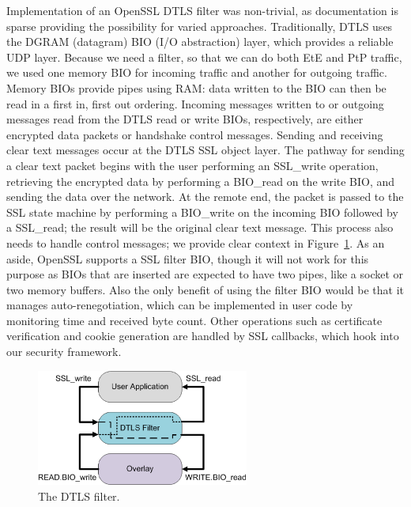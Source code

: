 \documentclass[conference]{IEEEtran}
\begin{document}
Implementation of an OpenSSL DTLS filter was non-trivial, as documentation is
sparse providing the possibility for varied approaches.  Traditionally, DTLS
uses the DGRAM (datagram) BIO (I/O abstraction) layer, which provides a reliable
UDP layer.  Because we need a filter, so that we can do both EtE and PtP traffic,
we used one memory BIO  for incoming traffic and another for outgoing traffic.
Memory BIOs provide pipes using RAM: data written to the BIO can then be read
in a first in, first out ordering.  Incoming messages written to or outgoing
messages read from the DTLS read or write BIOs, respectively, are 
either encrypted data packets or handshake control messages.  Sending and 
receiving clear text messages occur at the DTLS SSL object layer.  The pathway
for sending a clear text packet begins with the user performing an SSL\_write
operation, retrieving the encrypted data by performing a BIO\_read on the write
BIO, and sending the data over the network.  At the remote end, the packet is
passed to the SSL state machine by performing a BIO\_write on the incoming BIO
followed by a SSL\_read; the result will be the original clear text message.
This process also needs to handle control messages; we provide clear context in
Figure~\ref{fig:dtls_filter}.  As an aside, OpenSSL supports a SSL filter
BIO, though it will not work for this purpose as BIOs that are inserted are
expected to have two pipes, like a socket or two memory buffers.  Also the only
benefit of using the filter BIO would be that it manages auto-renegotiation,
which can be implemented in user code by monitoring time and received byte
count.  Other operations such as certificate verification and cookie generation
are handled by SSL callbacks, which hook into our security framework.

\begin{figure}[!h]
\centering
\includegraphics[width=2.75in]{dtls_filter.eps}
\caption{The DTLS filter.}
\label{fig:dtls_filter}
\end{figure}
\end{document}
